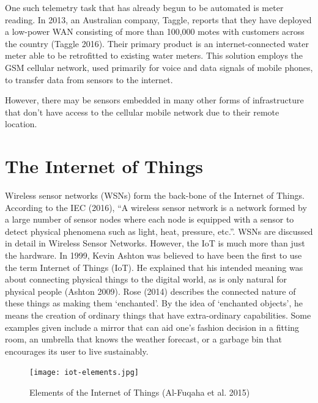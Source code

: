 One such telemetry task that has already begun to be automated is meter reading. In 2013, an Australian company, Taggle, reports that they have deployed a low-power WAN consisting of more than 100,000 motes with customers across the country (Taggle 2016). Their primary product is an internet-connected water meter able to be retrofitted to existing water meters. This solution employs the GSM cellular network, used primarily for voice and data signals of mobile phones, to transfer data from sensors to the internet.

However, there may be sensors embedded in many other forms of infrastructure that don’t have access to the cellular mobile network due to their remote location.


\section{The Internet of Things}

Wireless sensor networks (WSNs) form the back-bone of the Internet of Things. According to the IEC (2016), “A wireless sensor network is a network formed by a large number of sensor nodes where each node is equipped with a sensor to detect physical phenomena such as light, heat, pressure, etc.”. WSNs are discussed in detail in Wireless Sensor Networks.
However, the IoT is much more than just the hardware. In 1999, Kevin Ashton was believed to have been the first to use the term Internet of Things (IoT). He explained that his intended meaning was about connecting physical things to the digital world, as is only natural for physical people (Ashton 2009). Rose (2014) describes the connected nature of these things as making them ‘enchanted’. By the idea of ‘enchanted objects’, he means the creation of ordinary things that have extra-ordinary capabilities. Some examples given include a mirror that can aid one’s fashion decision in a fitting room, an umbrella that knows the weather forecast, or a garbage bin that encourages its user to live sustainably.

\begin{figure}
    \centering
    \texttt{[image: iot-elements.jpg]}
    \caption{Elements of the Internet of Things (Al-Fuqaha et al. 2015)}
    \label{fig:iot-elements}
\end{figure}

